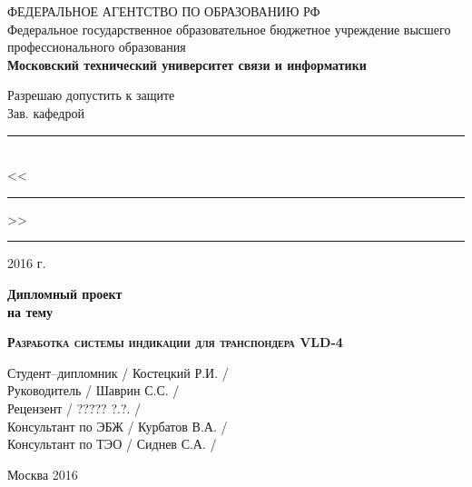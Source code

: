 \begin{titlepage}
  \newpage

  \begin{center}
    ФЕДЕРАЛЬНОЕ АГЕНТСТВО ПО ОБРАЗОВАНИЮ РФ \\
    \vspace{1cm}
    Федеральное государственное образовательное бюджетное учреждение высшего
    профессионального образования\\
    \textbf{Московский технический университет связи и информатики}
  \end{center}

  \vspace{1.5em}

  \hspace{-1cm}\begin{minipage}{0.35\textwidth}
    \begin{center}
      Разрешаю допустить к защите \\
      Зав. кафедрой \\
    \end{center}
    \vspace{-1.0em}
    \rule{\textwidth}{.1pt} \\
    <<\rule{2em}{.1pt}>> \rule{6em}{.1pt} 2016 г.
  \end{minipage}
  \vfill

  \begin{center}
    \Huge\bfseries Дипломный проект \\ на тему
  \end{center}

  \vspace{0.5em}

  \begin{center}
    \textsc{\textbf{\Large Разработка системы индикации для транспондера VLD-4}}
  \end{center}

  \vfill

  \begin{flushleft}
    Студент--дипломник \hrulefill / Костецкий Р.И. / \\
    \vspace{1.5em}
    Руководитель \hrulefill / Шаврин С.С. /\\
    \vspace{1.5em}
    Рецензент \hrulefill  / ????? ?.?. /\\
    \vspace{1.5em}
    Консультант по ЭБЖ \hrulefill / Курбатов В.А. /\\
    \vspace{1.5em}
    Консультант по ТЭО \hrulefill / Сиднев С.А. /\\
    \vspace{1.5em}
  \end{flushleft}

  \vspace{\fill}

  \begin{center}
    Москва 2016
  \end{center}

\end{titlepage}